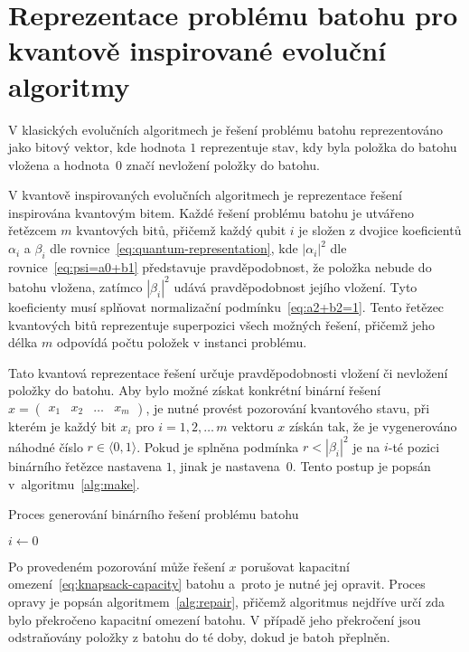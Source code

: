 \section{Reprezentace problému batohu pro kvantově inspirované evoluční algoritmy}
V klasických evolučních algoritmech je řešení problému batohu reprezentováno jako bitový vektor, kde hodnota $1$ reprezentuje stav, kdy byla položka do batohu vložena a hodnota~$0$ značí nevložení položky do batohu.

V kvantově inspirovaných evolučních algoritmech je reprezentace řešení inspirována kvantovým bitem. 
Každé řešení problému batohu je utvářeno řetězcem $m$ kvantových bitů, přičemž každý qubit $i$ je složen z dvojice koeficientů $\alpha_i$ a $\beta_i$ dle rovnice~\ref{eq:quantum-representation}, kde $\left| \alpha_i \right|^2$ dle rovnice~\ref{eq:psi=a0+b1} představuje pravděpodobnost, že položka nebude do batohu vložena, zatímco $\left| \beta_i \right|^2$ udává pravděpodobnost jejího vložení. 
Tyto koeficienty musí splňovat normalizační podmínku~\ref{eq:a2+b2=1}.
Tento řetězec kvantových bitů reprezentuje superpozici všech možných řešení, přičemž jeho délka $m$ odpovídá počtu položek v instanci problému.

Tato kvantová reprezentace řešení určuje pravděpodobnosti vložení či nevložení položky do batohu. 
Aby bylo možné získat konkrétní binární řešení $x = \begin{pmatrix} x_1 & x_2 & \dots & x_m \end{pmatrix}$, je nutné provést pozorování kvantového stavu, při kterém je každý bit $x_i$ pro $i = 1,2,\dots\,m$ vektoru $x$ získán tak, že je vygenerováno náhodné číslo $r \in \langle 0, 1 \rangle$. 
Pokud je splněna podmínka $r < \left| \beta_i \right|^2$ je na $i$-té pozici binárního řetězce nastavena $1$, jinak je nastavena~$0$. 
Tento postup je popsán v~algoritmu~\ref{alg:make}.

\begin{algorithm}[ht!]
    \caption{Proces generování binárního řešení problému batohu}
    \label{alg:make}
    $i \gets 0$\;
\end{algorithm}

Po provedeném pozorování může řešení $x$ porušovat kapacitní omezení~\ref{eq:knapsack-capacity} batohu a~proto je nutné jej opravit. 
Proces opravy je popsán algoritmem~\ref{alg:repair}, přičemž algoritmus nejdříve určí zda bylo překročeno kapacitní omezení batohu. 
V případě jeho překročení jsou odstraňovány položky z batohu do té doby, dokud je batoh přeplněn. 

